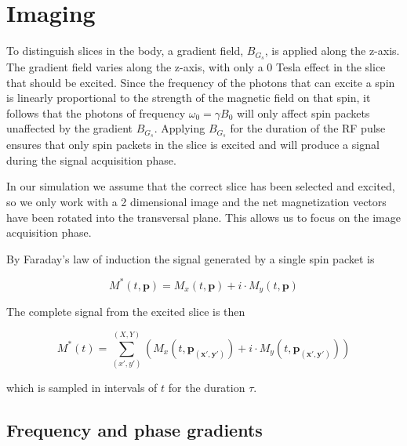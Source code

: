 \section{Imaging}



To distinguish slices in the body, a gradient field, $B_{G_s}$, is applied
along the z-axis. The gradient field varies along the z-axis, with
only a 0 Tesla effect in the slice that should be excited. Since the
frequency of the photons that can excite a spin is linearly
proportional to the strength of the magnetic field on that spin, it
follows that the photons of frequency $\omega_0 = \gamma B_0$ will
only affect spin packets unaffected by the gradient $B_{G_s}$. Applying
$B_{G_s}$ for the duration of the RF pulse ensures that only spin packets
in the slice is excited and will produce a signal during the signal
acquisition phase.

In our simulation we assume that the correct slice has been selected
and excited, so we only work with a 2 dimensional image and the net
magnetization vectors have been rotated into the transversal
plane. This allows us to focus on the image acquisition phase.


By Faraday's law of induction the signal generated by a single spin
packet is

\begin{displaymath}
  M^*(t, \mathbf{p}) = M_x(t, \mathbf{p}) + i \cdot M_y(t, \mathbf{p})
\end{displaymath}

The complete signal from the excited slice is then

\begin{displaymath}
  M^*(t) = \sum^{(X, Y)}_{(x',y')} (M_x(t, \mathbf{p_{(x',y')}}) + i \cdot M_y(t, \mathbf{p_{(x',y')}}))
\end{displaymath}

which is sampled in intervals of $t$ for the duration $\tau$.

\subsection{Frequency and phase gradients}

